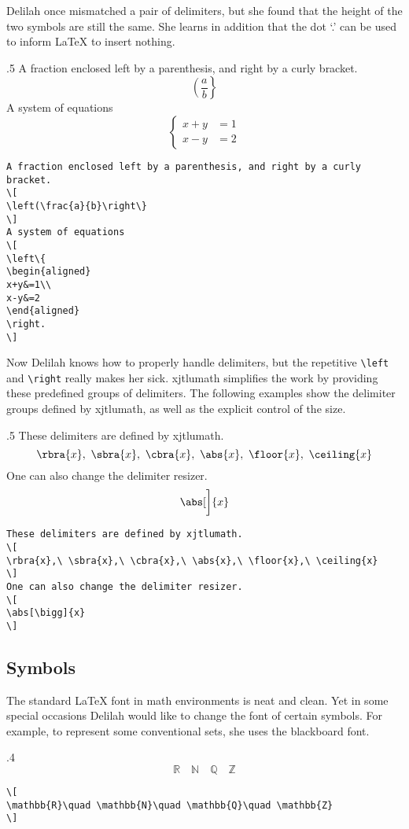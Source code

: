 Delilah once mismatched a pair of delimiters, but she found that the height of the two symbols are still the same. She learns in addition that the dot `.' can be used to inform \LaTeX{} to insert nothing.
\begin{parexammar}{.5\textandmarginlen}{
A fraction enclosed left by a parenthesis, and right by a curly bracket.
\[
\left(\frac{a}{b}\right\}
\]
A system of equations
\[
\left\{
\begin{aligned}
x+y&=1\\
x-y&=2
\end{aligned}
\right.
\]
}
\begin{lstlisting}
A fraction enclosed left by a parenthesis, and right by a curly bracket.
\[
\left(\frac{a}{b}\right\}
\]
A system of equations
\[
\left\{
\begin{aligned}
x+y&=1\\
x-y&=2
\end{aligned}
\right.
\]
\end{lstlisting}
\end{parexammar}

Now Delilah knows how to properly handle delimiters, but the repetitive \verb=\left= and \verb=\right= really makes her sick. xjtlumath simplifies the work by providing these predefined groups of delimiters. The following examples show the delimiter groups defined by xjtlumath, as well as the explicit control of the size.
\begin{parexammar}{.5\textandmarginlen}{
These delimiters are defined by xjtlumath.
\[
\rbra{x},\ \sbra{x},\ \cbra{x},\ \abs{x},\ \floor{x},\ \ceiling{x}
\]
One can also change the delimiter resizer.
\[
\abs[\bigg]{x}
\]
}
\begin{lstlisting}
These delimiters are defined by xjtlumath.
\[
\rbra{x},\ \sbra{x},\ \cbra{x},\ \abs{x},\ \floor{x},\ \ceiling{x}
\]
One can also change the delimiter resizer.
\[
\abs[\bigg]{x}
\]
\end{lstlisting}
\end{parexammar}

\subsection{Symbols}
The standard \LaTeX{} font in math environments is neat and clean. Yet in some special occasions Delilah would like to change the font of certain symbols. For example, to represent some conventional sets, she uses the blackboard font.
\begin{parexammar}{.4\textandmarginlen}{
\[
\mathbb{R}\quad \mathbb{N}\quad \mathbb{Q}\quad \mathbb{Z}
\]
}
\begin{lstlisting}
\[
\mathbb{R}\quad \mathbb{N}\quad \mathbb{Q}\quad \mathbb{Z}
\]
\end{lstlisting}
\end{parexammar}

